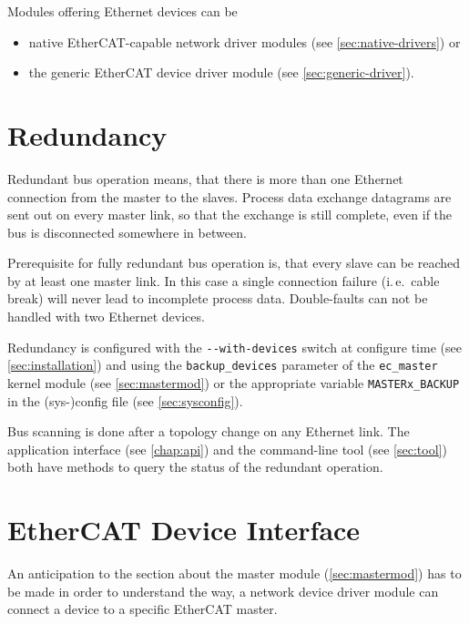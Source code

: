 \documentclass[a4paper,12pt,BCOR6mm,bibtotoc,idxtotoc]{scrbook}
\begin{document}
Modules offering Ethernet devices can be

\begin{itemize}
\item native EtherCAT-capable network driver modules (see
\autoref{sec:native-drivers}) or
\item the generic EtherCAT device driver module (see
\autoref{sec:generic-driver}).
\end{itemize}


\section{Redundancy}
\label{sec:redundancy}

Redundant bus operation means, that there is more than one Ethernet connection
from the master to the slaves. Process data exchange datagrams are sent out on
every master link, so that the exchange is still complete, even if the bus is
disconnected somewhere in between.

Prerequisite for fully redundant bus operation is, that every slave can be
reached by at least one master link. In this case a single connection failure
(i.\,e.~cable break) will never lead to incomplete process data. Double-faults
can not be handled with two Ethernet devices.

Redundancy is configured with the \lstinline+--with-devices+ switch at
configure time (see \autoref{sec:installation}) and using the
\lstinline+backup_devices+ parameter of the \lstinline+ec_master+ kernel
module (see \autoref{sec:mastermod}) or the appropriate variable
\lstinline+MASTERx_BACKUP+ in the (sys-)config file (see
\autoref{sec:sysconfig}).

Bus scanning is done after a topology change on any Ethernet link. The
application interface (see \autoref{chap:api}) and the command-line tool (see
\autoref{sec:tool}) both have methods to query the status of the redundant
operation.


\section{EtherCAT Device Interface}
\label{sec:ecdev}

An anticipation to the section about the master module
(\autoref{sec:mastermod}) has to be made in order to understand the way, a
network device driver module can connect a device to a specific EtherCAT
master.
\end{document}
